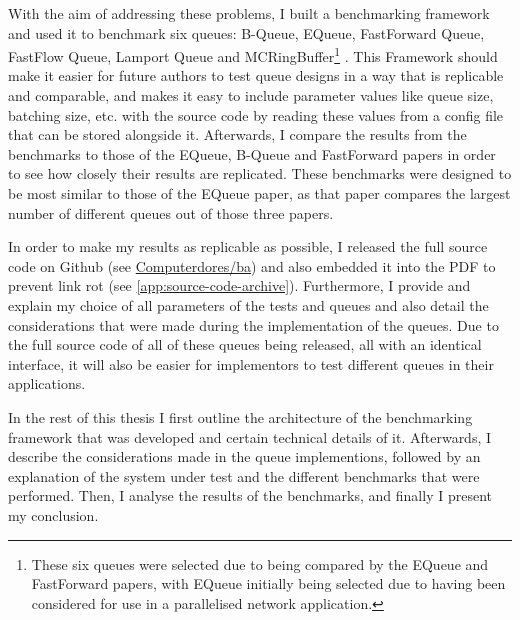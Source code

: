 With the aim of addressing these problems, I built a benchmarking framework and used it to benchmark six
queues: B-Queue, EQueue, FastForward Queue, FastFlow Queue, Lamport Queue and MCRingBuffer\footnote{These six
    queues were selected due to being compared by the EQueue and FastForward papers, with EQueue initially being
selected due to having been considered for use in a parallelised network application.}
\cite{B-Queue,EQueue,FastForward,FastFlowGithub,Lamport,MCRingBuffer}.
This Framework should make it easier for future authors to test queue designs in a way that is replicable and
comparable, and makes it easy to include parameter values like queue size, batching size, etc. with the
source code by reading these values from a config file that can be stored alongside it.
Afterwards, I compare the results from the benchmarks to those of the EQueue, B-Queue and FastForward papers
in order to see how closely their results are replicated.
These benchmarks were designed to be most similar to those of the EQueue paper, as that paper compares the
largest number of different queues out of those three papers.

In order to make my results as replicable as possible, I released the full source code on Github (see
\href{https://github.com/Computerdores/ba}{Computerdores/ba}) and also embedded it into the PDF to prevent
link rot (see \autoref{app:source-code-archive}).
Furthermore, I provide and explain my choice of all parameters of the tests and queues and also detail the
considerations that were made during the implementation of the queues.
Due to the full source code of all of these queues being released, all with an identical interface, it will
also be easier for implementors to test different queues in their applications.

In the rest of this thesis I first outline the architecture of the benchmarking framework that was developed
and certain technical details of it.
Afterwards, I describe the considerations made in the queue implementions, followed by an explanation of the
system under test and the different benchmarks that were performed.
Then, I analyse the results of the benchmarks, and finally I present my conclusion.
